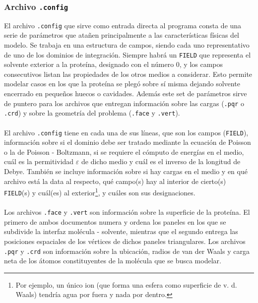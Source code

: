 \documentclass[12pt, twoside, onehalfspace, numbers, spanish]{ezthesis}
\numberwithin{equation}{section}
\begin{document}
\subsubsection{Archivo \texttt{.config}}
El archivo \texttt{.config} que sirve como entrada directa al programa consta de una serie de parámetros que atañen principalmente a las características físicas del modelo. Se trabaja en una estructura de campos, siendo cada uno representativo de uno de los dominios de integración. Siempre habrá un \texttt{FIELD} que representa el solvente exterior a la proteína, designado con el número 0, y los campos consecutivos listan las propiedades de los otros medios a considerar. Esto permite modelar casos en los que la proteína se plegó sobre sí misma dejando solvente encerrado en pequeños huecos o cavidades. Además este set de parámetros sirve de puntero para los archivos que entregan información sobre las cargas (\texttt{.pqr} o \texttt{.crd}) y sobre la geometría del problema (\texttt{.face} y \texttt{.vert}).\\\\
El archivo \texttt{.config} tiene en cada una de sus líneas, que son los campos (\texttt{FIELD}), información sobre si el dominio debe ser tratado mediante la ecuación de Poisson o la de Poisson - Boltzmann, si se requiere el cómputo de energías en el medio, cuál es la permitividad $\varepsilon$ de dicho medio y cuál es el inverso de la longitud de Debye. También se incluye información sobre si hay cargas en el medio y en qué archivo está la data al respecto, qué campo(s) hay al interior de cierto(s) \texttt{FIELD}(s) y cuál(es) al exterior\footnote{Por ejemplo, un único ion (que forma una esfera como superficie de v. d. Waals) tendría agua por fuera y nada por dentro.}, y cuáles son sus designaciones.\\\\
Los archivos \texttt{.face} y \texttt{.vert} son información sobre la superficie de la proteína. El primero de ambos documentos numera y ordena los paneles en los que se subdivide la interfaz molécula - solvente, mientras que el segundo entrega las posiciones espaciales de los vértices de dichos paneles triangulares. Los archivos \texttt{.pqr} y \texttt{.crd} son información sobre la ubicación, radios de van der Waals y carga neta de los átomos constituyentes de la molécula que se busca modelar.
\end{document}
